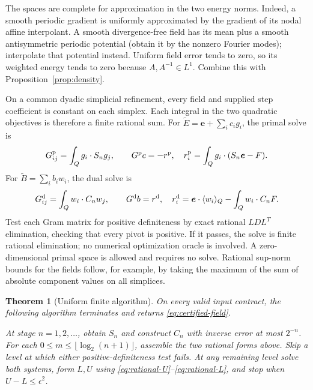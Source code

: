 \documentclass[11pt,a4paper]{article}
\numberwithin{equation}{section}
\newtheorem{theorem}{Theorem}[section]
\theoremstyle{definition}
\theoremstyle{remark}\newtheorem{remark}[theorem]{Remark}
\newcommand{\mean}[2]{\langle #1\rangle_{#2}}
\newcommand{\evec}{\boldsymbol e}
\begin{document}
The spaces are complete for approximation in the two energy norms.
Indeed, a smooth periodic gradient is uniformly approximated by the
gradient of its nodal affine interpolant. A smooth divergence-free
field has its mean plus a smooth antisymmetric periodic potential
(obtain it by the nonzero Fourier modes); interpolate that potential
instead. Uniform field error tends to zero, so its weighted energy
tends to zero because \(A,A^{-1}\in L^1\).
Combine this with Proposition~\ref{prop:density}.

On a common dyadic simplicial refinement, every field and supplied step
coefficient is constant on each simplex. Each integral in the two
quadratic objectives is therefore a finite rational sum.
For \(\widetilde E=\evec+\sum_i c_i g_i\), the primal solve is
\[
 G^{\rm p}_{ij}=\int_Qg_i\cdot S_ng_j,\qquad
 G^{\rm p}c=-r^{\rm p},\quad
 r^{\rm p}_i=\int_Qg_i\cdot(S_n\evec-F).
\]
For \(\widetilde B=\sum_i b_iw_i\), the dual solve is
\[
 G^{\rm d}_{ij}=\int_Qw_i\cdot C_nw_j,\qquad
 G^{\rm d}b=r^{\rm d},\quad
 r^{\rm d}_i=\evec\cdot\mean{w_i}Q-\int_Qw_i\cdot C_nF.
\]
Test each Gram matrix for positive definiteness by exact rational
\(LDL^T\) elimination, checking that every pivot is positive.
If it passes, the solve is finite rational elimination; no numerical
optimization oracle is involved. A zero-dimensional primal space is
allowed and requires no solve.
Rational sup-norm bounds for the fields follow, for example, by taking
the maximum of the sum of absolute component values on all simplices.

\begin{theorem}[Uniform finite algorithm]\label{thm:finite-algorithm}
On every valid input contract, the following algorithm terminates and
returns \eqref{eq:certified-field}.

At stage \(n=1,2,\ldots\), obtain \(S_n\) and construct \(C_n\) with
inverse error at most \(2^{-n}\). For each
\(0\leq m\leq\lfloor\log_2(n+1)\rfloor\), assemble the two rational
forms above. Skip a level at which either positive-definiteness test
fails. At any remaining level solve both systems, form \(L,U\) using
\eqref{eq:rational-U}--\eqref{eq:rational-L}, and stop when
\(U-L\leq\epsilon^2\).
\end{theorem}
\end{document}
